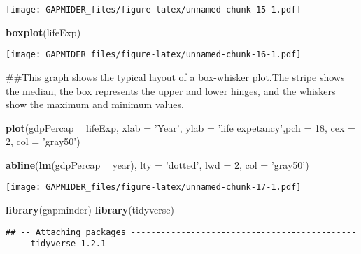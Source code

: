\documentclass[]{article}
\newenvironment{Shaded}{\begin{snugshade}}{\end{snugshade}}
\newcommand{\DataTypeTok}[1]{\textcolor[rgb]{0.13,0.29,0.53}{#1}}
\newcommand{\DecValTok}[1]{\textcolor[rgb]{0.00,0.00,0.81}{#1}}
\newcommand{\KeywordTok}[1]{\textcolor[rgb]{0.13,0.29,0.53}{\textbf{#1}}}
\newcommand{\NormalTok}[1]{#1}
\newcommand{\OperatorTok}[1]{\textcolor[rgb]{0.81,0.36,0.00}{\textbf{#1}}}
\newcommand{\StringTok}[1]{\textcolor[rgb]{0.31,0.60,0.02}{#1}}
\begin{document}
\texttt{[image: GAPMIDER\_files/figure-latex/unnamed-chunk-15-1.pdf]}

\begin{Shaded}
\begin{Highlighting}[]
\KeywordTok{boxplot}\NormalTok{(lifeExp)}
\end{Highlighting}
\end{Shaded}

\texttt{[image: GAPMIDER\_files/figure-latex/unnamed-chunk-16-1.pdf]}

\begin{Shaded}
\begin{Highlighting}[]
\NormalTok{##This graph shows the typical layout of a box-whisker plot.The stripe shows the median, the box represents the upper and lower hinges, and the whiskers show the maximum and minimum values.}
\end{Highlighting}
\end{Shaded}

\begin{Shaded}
\begin{Highlighting}[]
\KeywordTok{plot}\NormalTok{(gdpPercap }\OperatorTok{~}\StringTok{ }\NormalTok{lifeExp, }\DataTypeTok{xlab =} \StringTok{'Year'}\NormalTok{, }\DataTypeTok{ylab =} \StringTok{'life expetancy'}\NormalTok{,}\DataTypeTok{pch =} \DecValTok{18}\NormalTok{, }\DataTypeTok{cex =} \DecValTok{2}\NormalTok{, }\DataTypeTok{col =} \StringTok{'gray50'}\NormalTok{)}
 
\KeywordTok{abline}\NormalTok{(}\KeywordTok{lm}\NormalTok{(gdpPercap }\OperatorTok{~}\StringTok{ }\NormalTok{year), }\DataTypeTok{lty =} \StringTok{'dotted'}\NormalTok{, }\DataTypeTok{lwd =} \DecValTok{2}\NormalTok{, }\DataTypeTok{col =} \StringTok{'gray50'}\NormalTok{)}
\end{Highlighting}
\end{Shaded}

\texttt{[image: GAPMIDER\_files/figure-latex/unnamed-chunk-17-1.pdf]}

\begin{Shaded}
\begin{Highlighting}[]
\KeywordTok{library}\NormalTok{(gapminder)}
\KeywordTok{library}\NormalTok{(tidyverse)}
\end{Highlighting}
\end{Shaded}

\begin{verbatim}
## -- Attaching packages ------------------------------------------------- tidyverse 1.2.1 --
\end{verbatim}
\end{document}
